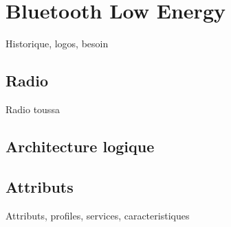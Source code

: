 \section{Bluetooth Low Energy}
\begin{frame}
Historique, logos, besoin
\end{frame}

\subsection{Radio}
\begin{frame}
Radio toussa
\end{frame}

\subsection{Architecture logique}
\begin{frame}
\end{frame}

\subsection{Attributs}
\begin{frame}
Attributs, profiles, services, caracteristiques
\end{frame}


